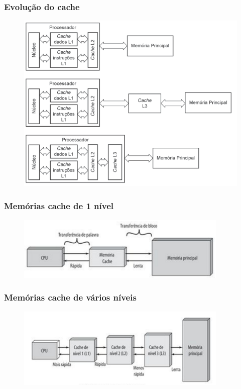 \documentclass[aspectratio=169,
				xcolor=table]{beamer}
\begin{document}
	\begin{frame}
		\frametitle{Evolução do cache}
		
		\begin{figure}[hbtp]
			\centering
			\includegraphics[height=0.8\textheight, keepaspectratio]{../figs/cap06/evolucao2.png}
		\end{figure}
	\end{frame}		
	
	\begin{frame}
		\frametitle{Memórias cache de 1 nível}
		\begin{figure}[hbtp]
			\centering
			\includegraphics[width=0.9\textwidth, keepaspectratio]{../figs/cap06/cache2.png}
		\end{figure}
	\end{frame}
	
	\begin{frame}
		\frametitle{Memórias cache de vários níveis}
		\begin{figure}[hbtp]
			\centering
			\includegraphics[width=0.9\textwidth, keepaspectratio]{../figs/cap06/cache3.png}
		\end{figure}
	\end{frame}
\end{document}
